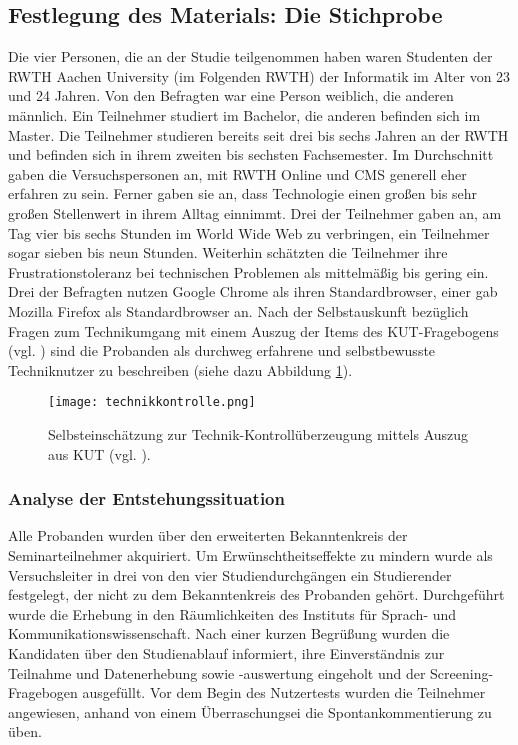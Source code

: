 \subsection*{Festlegung des Materials: Die Stichprobe}
Die vier Personen, die an der Studie teilgenommen haben waren Studenten der RWTH Aachen University (im Folgenden RWTH) der Informatik im Alter von 23 und 24 Jahren. Von den Befragten war eine Person weiblich, die anderen männlich. Ein Teilnehmer studiert im Bachelor, die anderen befinden sich im Master. Die Teilnehmer studieren bereits seit drei bis sechs Jahren an der RWTH und befinden sich in ihrem zweiten bis sechsten Fachsemester. Im Durchschnitt gaben die Versuchspersonen an, mit RWTH Online und CMS generell eher erfahren zu sein. Ferner gaben sie an, dass Technologie einen großen bis sehr großen Stellenwert in ihrem Alltag einnimmt. Drei der Teilnehmer gaben an, am Tag vier bis sechs Stunden im World Wide Web zu verbringen, ein Teilnehmer sogar sieben bis neun Stunden. Weiterhin schätzten die Teilnehmer ihre Frustrationstoleranz bei technischen Problemen als mittelmäßig bis gering ein. Drei der Befragten nutzen Google Chrome als ihren Standardbrowser, einer gab Mozilla Firefox als Standardbrowser an. Nach der Selbstauskunft bezüglich Fragen zum Technikumgang mit einem Auszug der Items des KUT-Fragebogens (vgl. \citeauthor{beier2004kontrolluberzeugungen}) sind die Probanden als durchweg erfahrene und selbstbewusste Techniknutzer zu beschreiben (siehe dazu Abbildung \ref{fig:technikkontrolle}).

\begin{figure}[hbt!]
 \centering
 \texttt{[image: technikkontrolle.png]}
 \caption{Selbsteinschätzung zur Technik-Kontrollüberzeugung mittels Auszug aus KUT (vgl. \cite{beier2004kontrolluberzeugungen}).}
 \label{fig:technikkontrolle}
\end{figure}

\subsubsection*{Analyse der Entstehungssituation}
Alle Probanden wurden über den erweiterten Bekanntenkreis der Seminarteilnehmer akquiriert. Um Erwünschtheitseffekte zu mindern wurde als Versuchsleiter in drei von den vier Studiendurchgängen ein Studierender festgelegt, der nicht zu dem Bekanntenkreis des Probanden gehört. Durchgeführt wurde die Erhebung in den Räumlichkeiten des Instituts für Sprach- und Kommunikationswissenschaft. Nach einer kurzen Begrüßung wurden die Kandidaten über den Studienablauf informiert, ihre Einverständnis zur Teilnahme und Datenerhebung sowie -auswertung eingeholt und der Screening-Fragebogen ausgefüllt. Vor dem Begin des Nutzertests wurden die Teilnehmer angewiesen, anhand von einem Überraschungsei die Spontankommentierung zu üben.

